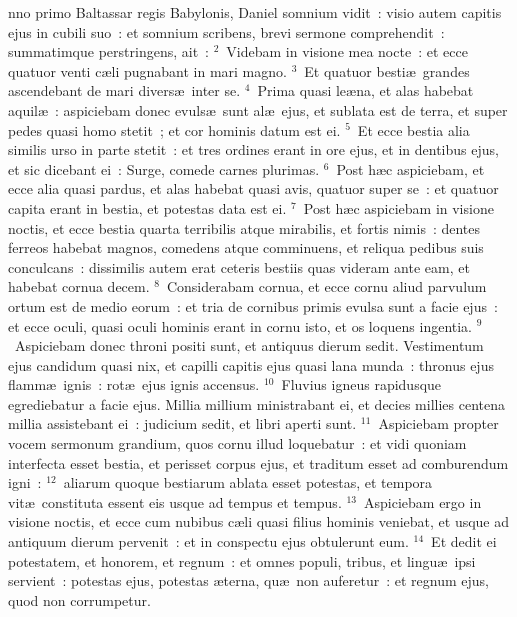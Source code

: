 \bchapter
{}nno primo Baltassar regis Babylonis, Daniel somnium vidit~: visio autem capitis ejus in cubili suo~: et somnium scribens, brevi sermone comprehendit~: summatimque perstringens, ait~:
${}^{2}$~Videbam in visione mea nocte~: et ecce quatuor venti c\ae li pugnabant in mari magno.
${}^{3}$~Et quatuor besti\ae\ grandes ascendebant de mari divers\ae\ inter se.
${}^{4}$~Prima quasi le\ae na, et alas habebat aquil\ae~: aspiciebam donec evuls\ae\ sunt al\ae\ ejus, et sublata est de terra, et super pedes quasi homo stetit~; et cor hominis datum est ei.
${}^{5}$~Et ecce bestia alia similis urso in parte stetit~: et tres ordines erant in ore ejus, et in dentibus ejus, et sic dicebant ei~: Surge, comede carnes plurimas.
${}^{6}$~Post h\ae c aspiciebam, et ecce alia quasi pardus, et alas habebat quasi avis, quatuor super se~: et quatuor capita erant in bestia, et potestas data est ei.
${}^{7}$~Post h\ae c aspiciebam in visione noctis, et ecce bestia quarta terribilis atque mirabilis, et fortis nimis~: dentes ferreos habebat magnos, comedens atque comminuens, et reliqua pedibus suis conculcans~: dissimilis autem erat ceteris bestiis quas videram ante eam, et habebat cornua decem.
${}^{8}$~Considerabam cornua, et ecce cornu aliud parvulum ortum est de medio eorum~: et tria de cornibus primis evulsa sunt a facie ejus~: et ecce oculi, quasi oculi hominis erant in cornu isto, et os loquens ingentia.
${}^{9}$~Aspiciebam donec throni positi sunt, et antiquus dierum sedit. Vestimentum ejus candidum quasi nix, et capilli capitis ejus quasi lana munda~: thronus ejus flamm\ae\ ignis~: rot\ae\ ejus ignis accensus.
${}^{10}$~Fluvius igneus rapidusque egrediebatur a facie ejus. Millia millium ministrabant ei, et decies millies centena millia assistebant ei~: judicium sedit, et libri aperti sunt.
${}^{11}$~Aspiciebam propter vocem sermonum grandium, quos cornu illud loquebatur~: et vidi quoniam interfecta esset bestia, et perisset corpus ejus, et traditum esset ad comburendum igni~:
${}^{12}$~aliarum quoque bestiarum ablata esset potestas, et tempora vit\ae\ constituta essent eis usque ad tempus et tempus.
${}^{13}$~Aspiciebam ergo in visione noctis, et ecce cum nubibus c\ae li quasi filius hominis veniebat, et usque ad antiquum dierum pervenit~: et in conspectu ejus obtulerunt eum.
${}^{14}$~Et dedit ei potestatem, et honorem, et regnum~: et omnes populi, tribus, et lingu\ae\ ipsi servient~: potestas ejus, potestas \ae terna, qu\ae\ non auferetur~: et regnum ejus, quod non corrumpetur.



